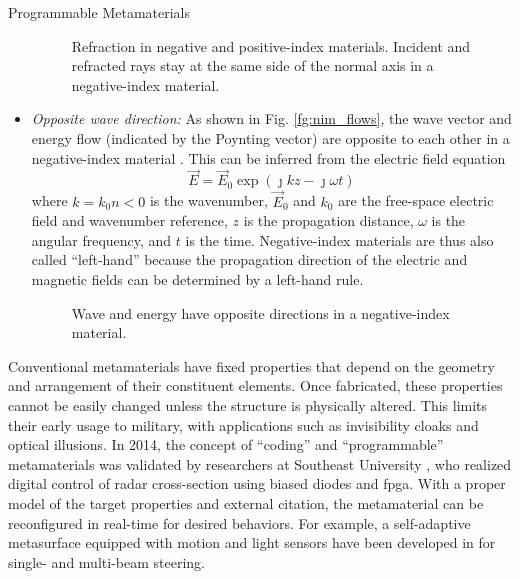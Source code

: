 \begin{section}{}
\begin{subsection}{Programmable Metamaterials}
\begin{itemize}
\begin{figure}[H]
{					\resizebox{0.45\columnwidth}{!}{
						
					}
				}
				\caption{Refraction in negative and positive-index materials. Incident and refracted rays stay at the same side of the normal axis in a negative-index material.}
			\end{figure}
			\item \emph{Opposite wave direction:} As shown in Fig. \ref{fg:nim_flows}, the wave vector and energy flow (indicated by the Poynting vector) are opposite to each other in a negative-index material \cite{Pendry2004}. This can be inferred from the electric field equation
			\begin{equation}
				\vec{E} = \vec{E}_0 \exp(\jmath k z - \jmath \omega t)
			\end{equation}
			where $k = k_0 n < 0$ is the wavenumber, $\vec{E}_0$ and $k_0$ are the free-space electric field and wavenumber reference, $z$ is the propagation distance, $\omega$ is the angular frequency, and $t$ is the time.
			Negative-index materials are thus also called ``left-hand'' because the propagation direction of the electric and magnetic fields can be determined by a left-hand rule.
			\begin{figure}[H]
				\centering
				\caption{Wave and energy have opposite directions in a negative-index material.}
			\end{figure}
		\end{itemize}

		Conventional metamaterials have fixed properties that depend on the geometry and arrangement of their constituent elements.
		Once fabricated, these properties cannot be easily changed unless the structure is physically altered.
		This limits their early usage to military, with applications such as invisibility cloaks and optical illusions.
		In 2014, the concept of ``coding'' and ``programmable'' metamaterials was validated by researchers at Southeast University \cite{Cui2014}, who realized digital control of radar cross-section using biased diodes and \gls{fpga}.
		With a proper model of the target properties and external citation, the metamaterial can be reconfigured in real-time for desired behaviors.
		For example, a self-adaptive metasurface equipped with motion and light sensors have been developed in \cite{Ma2019} for single- and multi-beam steering.


\end{subsection}
\end{section}
